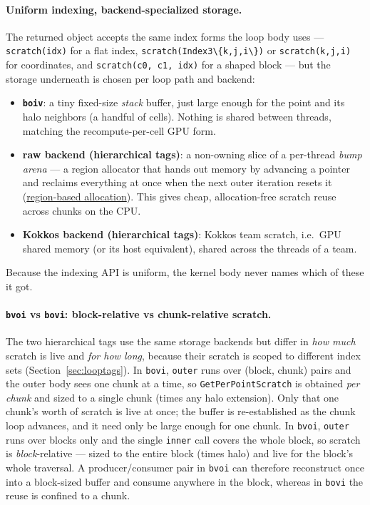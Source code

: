 \documentclass[11pt]{article}
\newcommand{\code}[1]{\lstinline[basicstyle=\ttfamily]|#1|}
\begin{document}
\paragraph{Uniform indexing, backend-specialized storage.} The returned object
accepts the same index forms the loop body uses --- \code{scratch(idx)} for a flat
index, \code{scratch(Index3\{k,j,i\})} or \code{scratch(k,j,i)} for coordinates,
and \code{scratch(c0, c1, idx)} for a shaped block --- but the storage underneath
is chosen per loop path and backend:
\begin{itemize}
\item \textbf{\code{boiv}}: a tiny fixed-size \emph{stack} buffer, just large
  enough for the point and its halo neighbors (a handful of cells). Nothing is
  shared between threads, matching the recompute-per-cell GPU form.
\item \textbf{raw backend (hierarchical tags)}: a non-owning slice of a per-thread
  \emph{bump arena} --- a region allocator that hands out memory by advancing a
  pointer and reclaims everything at once when the next outer iteration resets it
  (\href{https://en.wikipedia.org/wiki/Region-based_memory_management}{region-based
  allocation}). This gives cheap, allocation-free scratch reuse across chunks on
  the CPU.
\item \textbf{Kokkos backend (hierarchical tags)}: Kokkos team scratch, i.e.\
  GPU shared memory (or its host equivalent), shared across the threads of a team.
\end{itemize}
Because the indexing API is uniform, the kernel body never names which of these it
got.

\paragraph{\code{bvoi} vs \code{bovi}: block-relative vs chunk-relative scratch.}
The two hierarchical tags use the same storage backends but differ in \emph{how
much} scratch is live and \emph{for how long}, because their scratch is scoped to
different index sets (Section~\ref{sec:looptags}). In \code{bovi}, \code{outer}
runs over (block, chunk) pairs and the outer body sees one chunk at a time, so
\code{GetPerPointScratch} is obtained \emph{per chunk} and sized to a single chunk
(times any halo extension). Only that one chunk's worth of scratch is live at once;
the buffer is re-established as the chunk loop advances, and it need only be large
enough for one chunk. In \code{bvoi}, \code{outer} runs over blocks only and the
single \code{inner} call covers the whole block, so scratch is \emph{block}-relative
--- sized to the entire block (times halo) and live for the block's whole
traversal. A producer/consumer pair in \code{bvoi} can therefore reconstruct once
into a block-sized buffer and consume anywhere in the block, whereas in \code{bovi}
the reuse is confined to a chunk.
\end{document}

